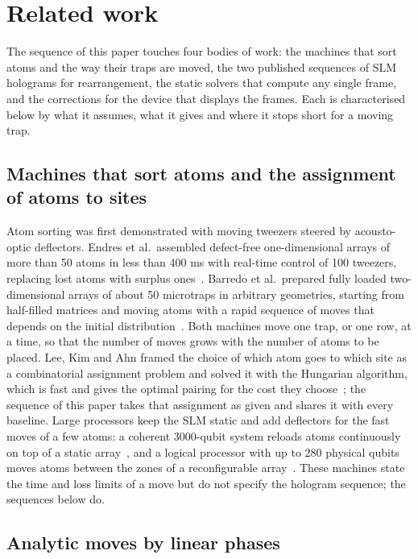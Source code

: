 \section{Related work}\label{sec:related}

The sequence of this paper touches four bodies of work: the machines that sort atoms and the way their traps are moved, the two published sequences of SLM holograms for rearrangement, the static solvers that compute any single frame, and the corrections for the device that displays the frames. Each is characterised below by what it assumes, what it gives and where it stops short for a moving trap.

\subsection{Machines that sort atoms and the assignment of atoms to sites}

Atom sorting was first demonstrated with moving tweezers steered by acousto-optic deflectors. Endres et al.\ assembled defect-free one-dimensional arrays of more than 50 atoms in less than 400 ms with real-time control of 100 tweezers, replacing lost atoms with surplus ones~\cite{endres}. Barredo et al.\ prepared fully loaded two-dimensional arrays of about 50 microtraps in arbitrary geometries, starting from half-filled matrices and moving atoms with a rapid sequence of moves that depends on the initial distribution~\cite{barredo}. Both machines move one trap, or one row, at a time, so that the number of moves grows with the number of atoms to be placed. Lee, Kim and Ahn framed the choice of which atom goes to which site as a combinatorial assignment problem and solved it with the Hungarian algorithm, which is fast and gives the optimal pairing for the cost they choose~\cite{lee2017}; the sequence of this paper takes that assignment as given and shares it with every baseline. Large processors keep the SLM static and add deflectors for the fast moves of a few atoms: a coherent 3000-qubit system reloads atoms continuously on top of a static array~\cite{chiu}, and a logical processor with up to 280 physical qubits moves atoms between the zones of a reconfigurable array~\cite{bluvstein}. These machines state the time and loss limits of a move but do not specify the hologram sequence; the sequences below do.

\subsection{Analytic moves by linear phases}

